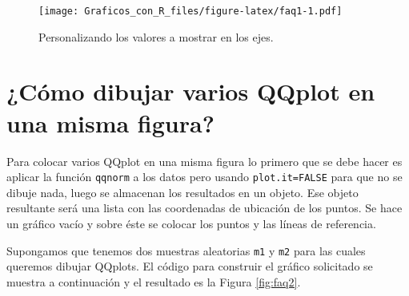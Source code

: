 \documentclass[10pt,]{krantz}
\begin{document}
\begin{figure}[htbp]
\centering
\texttt{[image: Graficos\_con\_R\_files/figure-latex/faq1-1.pdf]}
\caption{\label{fig:faq1}Personalizando los valores a mostrar en los ejes.}
\end{figure}

\section{¿Cómo dibujar varios QQplot en una misma
figura?}\label{como-dibujar-varios-qqplot-en-una-misma-figura}

Para colocar varios QQplot en una misma figura lo primero que se debe
hacer es aplicar la función \texttt{qqnorm} a los datos pero usando
\texttt{plot.it=FALSE} para que no se dibuje nada, luego se almacenan
los resultados en un objeto. Ese objeto resultante será una lista con
las coordenadas de ubicación de los puntos. Se hace un gráfico vacío y
sobre éste se colocar los puntos y las líneas de referencia.

Supongamos que tenemos dos muestras aleatorias \texttt{m1} y \texttt{m2}
para las cuales queremos dibujar QQplots. El código para construir el
gráfico solicitado se muestra a continuación y el resultado es la Figura
\ref{fig:faq2}.
\end{document}
